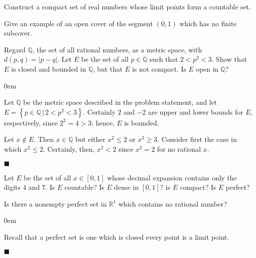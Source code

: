 \documentclass[12pt]{article}
\renewcommand{\qed}{\hfill$\blacksquare$}
\renewenvironment{proof}{\begin{addmargin}[1em]{0em}\begin{newproof}}{\end{newproof}\end{addmargin}\qed}
\newenvironment{problem}[2][Exercise]{\begin{trivlist}
\item[\hskip \labelsep {\bfseries #1}\hskip \labelsep {\bfseries #2.}]}{\end{trivlist}}
\begin{document}
\begin{problem}{2.13}
Construct a compact set of real numbers whose limit points form a countable set.
\end{problem}




\begin{problem}{2.14}
Give an example of an open cover of the segment $\left(0,1\right)$ which has no finite subcover.
\end{problem}


\begin{problem}{2.16}
Regard $\mathbb{Q}$, the set of all rational numbers, as a metric space, with $d\left(p,q\right)=\left|p-q\right|$. Let $E$ be the set of all $p\in \mathbb{Q}$ such that $2 < p^2 < 3$. Show that $E$ is closed and bounded in $\mathbb{Q}$, but that $E$ is not compact. Is $E$ open in $\mathbb{Q}$?
\end{problem}
\begin{proof}
Let $\mathbb{Q}$ be the metric space described in the problem statement, and let $E = \left\{p\in \mathbb{Q}\,|\, 2<p^2<3\right\}$. Certainly $2$ and $-2$ are upper and lower bounds for $E$, respectively, since $2^2 =4 > 3$; hence, $E$ is bounded. 

Let $x \notin E$. Then $x\in \mathbb{Q}$ but either $x^2 \leq 2$ or $x^3 \geq 3$. Consider first the case in which $x^2 \leq 2$. Certainly, then, $x^2<2 $ since $x^2=2$ for no rational $x$. 

\end{proof}






\begin{problem}{2.17}
Let $E$ be the set of all $x\in\left[0,1\right]$ whose decimal expansion contains only the digits $4$ and $7$. Is $E$ countable? Is $E$ dense in $\left[0,1\right]$? is $E$ compact? Is $E$ perfect?
\end{problem}


\begin{problem}{2.18}
Is there a nonempty perfect set in $\mathbb{R}^1$ which contains no rational number?
\end{problem}
\begin{proof}
{\color{red}Recall that a perfect set is one which is closed every point is a limit point.} 
\end{proof}
\end{document}
